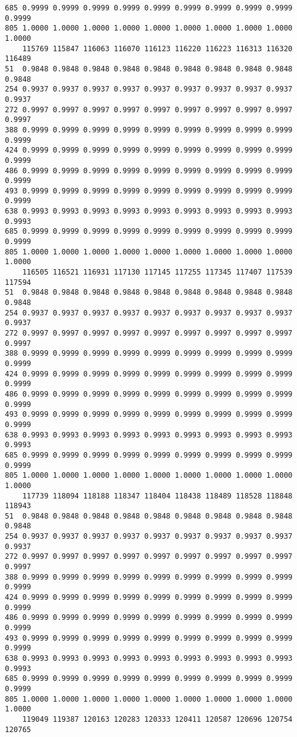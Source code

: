 \documentclass[
]{report}
\begin{document}
\begin{verbatim}
685 0.9999 0.9999 0.9999 0.9999 0.9999 0.9999 0.9999 0.9999 0.9999 0.9999
805 1.0000 1.0000 1.0000 1.0000 1.0000 1.0000 1.0000 1.0000 1.0000 1.0000
    115769 115847 116063 116070 116123 116220 116223 116313 116320 116489
51  0.9848 0.9848 0.9848 0.9848 0.9848 0.9848 0.9848 0.9848 0.9848 0.9848
254 0.9937 0.9937 0.9937 0.9937 0.9937 0.9937 0.9937 0.9937 0.9937 0.9937
272 0.9997 0.9997 0.9997 0.9997 0.9997 0.9997 0.9997 0.9997 0.9997 0.9997
388 0.9999 0.9999 0.9999 0.9999 0.9999 0.9999 0.9999 0.9999 0.9999 0.9999
424 0.9999 0.9999 0.9999 0.9999 0.9999 0.9999 0.9999 0.9999 0.9999 0.9999
486 0.9999 0.9999 0.9999 0.9999 0.9999 0.9999 0.9999 0.9999 0.9999 0.9999
493 0.9999 0.9999 0.9999 0.9999 0.9999 0.9999 0.9999 0.9999 0.9999 0.9999
638 0.9993 0.9993 0.9993 0.9993 0.9993 0.9993 0.9993 0.9993 0.9993 0.9993
685 0.9999 0.9999 0.9999 0.9999 0.9999 0.9999 0.9999 0.9999 0.9999 0.9999
805 1.0000 1.0000 1.0000 1.0000 1.0000 1.0000 1.0000 1.0000 1.0000 1.0000
    116505 116521 116931 117130 117145 117255 117345 117407 117539 117594
51  0.9848 0.9848 0.9848 0.9848 0.9848 0.9848 0.9848 0.9848 0.9848 0.9848
254 0.9937 0.9937 0.9937 0.9937 0.9937 0.9937 0.9937 0.9937 0.9937 0.9937
272 0.9997 0.9997 0.9997 0.9997 0.9997 0.9997 0.9997 0.9997 0.9997 0.9997
388 0.9999 0.9999 0.9999 0.9999 0.9999 0.9999 0.9999 0.9999 0.9999 0.9999
424 0.9999 0.9999 0.9999 0.9999 0.9999 0.9999 0.9999 0.9999 0.9999 0.9999
486 0.9999 0.9999 0.9999 0.9999 0.9999 0.9999 0.9999 0.9999 0.9999 0.9999
493 0.9999 0.9999 0.9999 0.9999 0.9999 0.9999 0.9999 0.9999 0.9999 0.9999
638 0.9993 0.9993 0.9993 0.9993 0.9993 0.9993 0.9993 0.9993 0.9993 0.9993
685 0.9999 0.9999 0.9999 0.9999 0.9999 0.9999 0.9999 0.9999 0.9999 0.9999
805 1.0000 1.0000 1.0000 1.0000 1.0000 1.0000 1.0000 1.0000 1.0000 1.0000
    117739 118094 118188 118347 118404 118438 118489 118528 118848 118943
51  0.9848 0.9848 0.9848 0.9848 0.9848 0.9848 0.9848 0.9848 0.9848 0.9848
254 0.9937 0.9937 0.9937 0.9937 0.9937 0.9937 0.9937 0.9937 0.9937 0.9937
272 0.9997 0.9997 0.9997 0.9997 0.9997 0.9997 0.9997 0.9997 0.9997 0.9997
388 0.9999 0.9999 0.9999 0.9999 0.9999 0.9999 0.9999 0.9999 0.9999 0.9999
424 0.9999 0.9999 0.9999 0.9999 0.9999 0.9999 0.9999 0.9999 0.9999 0.9999
486 0.9999 0.9999 0.9999 0.9999 0.9999 0.9999 0.9999 0.9999 0.9999 0.9999
493 0.9999 0.9999 0.9999 0.9999 0.9999 0.9999 0.9999 0.9999 0.9999 0.9999
638 0.9993 0.9993 0.9993 0.9993 0.9993 0.9993 0.9993 0.9993 0.9993 0.9993
685 0.9999 0.9999 0.9999 0.9999 0.9999 0.9999 0.9999 0.9999 0.9999 0.9999
805 1.0000 1.0000 1.0000 1.0000 1.0000 1.0000 1.0000 1.0000 1.0000 1.0000
    119049 119387 120163 120283 120333 120411 120587 120696 120754 120765

\end{verbatim}
\end{document}
